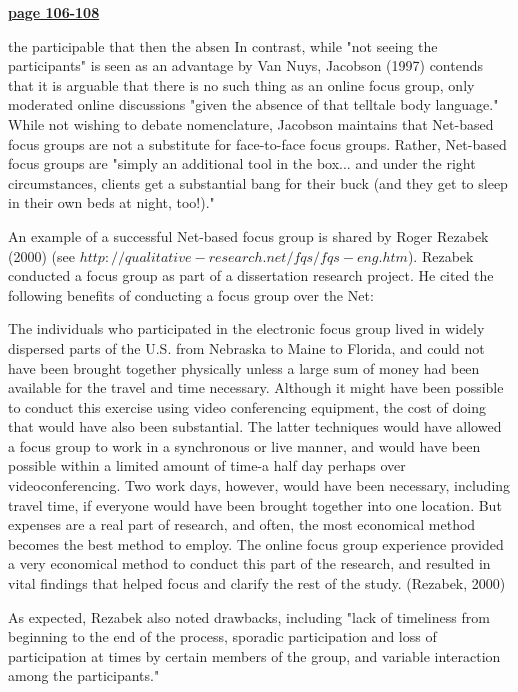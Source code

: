 \documentclass[a4]{article}
\begin{document}
\begin{center}
\underline{\textbf{	 page 106-108}}
\end{center}
 	
the participable that then the absen
In contrast, while "not seeing the participants" is seen as an advantage by Van Nuys, Jacobson (1997) contends that it is arguable that there is no such thing as an online focus group, only moderated online discussions "given the absence of that telltale body language." While not wishing to debate nomenclature, Jacobson maintains that Net-based focus groups are not a substitute for face-to-face focus groups. Rather, Net-based focus groups are "simply an additional tool in the box... and under the right circumstances, clients get a substantial bang for their buck (and they get to sleep in their own beds at night, too!)."

An example of a successful Net-based focus group is shared by Roger Rezabek (2000) (see  $ http://qualitative-research.net/fqs/fqs-eng.htm$). Rezabek conducted a focus group as part of a dissertation research project. He cited the following benefits of conducting a focus group over the Net:

	The individuals who participated in the electronic focus group lived in widely dispersed parts of the U.S. from Nebraska to Maine to Florida, and could not have been brought together physically unless a large sum of money had been available for the travel and time necessary. Although it might have been possible to conduct this exercise using video conferencing equipment, the cost of doing that would have also been substantial. The latter techniques would have allowed a focus group to work in a synchronous or live manner, and would have been possible within a limited amount of time-a half day perhaps over videoconferencing. Two work days, however, would have been necessary, including travel time, if everyone would have been brought together into one location. But expenses are a real part of research, and often, the most economical method becomes the best method to employ. The online focus group experience provided a very economical method to conduct this part of the research, and resulted in vital findings that helped focus and clarify the rest of the study. (Rezabek, 2000)


As expected, Rezabek also noted drawbacks, including "lack of timeliness from beginning to the end of the process, sporadic participation and loss of participation at times by certain members of the group, and variable interaction among the participants."
\end{document}
